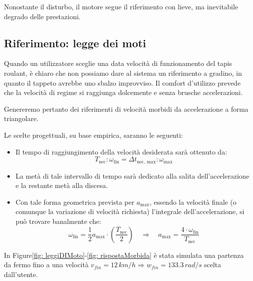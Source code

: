 \documentclass[a4paper,12pt]{article}
\begin{document}
Nonostante il disturbo, il motore segue il riferimento con lieve, ma inevitabile degrado delle prestazioni.


\subsection{Riferimento: legge dei moti}

Quando un utilizzatore sceglie una data velocità di funzionamento del tapis roulant, è chiaro che non possiamo dare al sistema un riferimento a gradino, in quanto il tappeto avrebbe uno sbalzo improvviso. Il comfort d'utilizzo prevede che la velocità di regime si raggiunga dolcemente e senza brusche accelerazioni.

\vspace{0.3cm}

Genereremo pertanto dei riferimenti di velocità morbidi da accelerazione a forma triangolare.

Le scelte progettuali, su base empirica, saranno le seguenti:

\begin{itemize}
    \item Il tempo di raggiungimento della velocità desiderata sarà ottenuto da: 
    \[
    T_{\text{nec}} : \omega_{\text{fin}} = \Delta t_{\text{nec, max}} : \omega_{\text{max}}
    \]
    
    \item La metà di tale intervallo di tempo sarà dedicato alla salita dell'accelerazione e la restante metà alla discesa.
    
    \item Con tale forma geometrica prevista per $a_{\text{max}}$, essendo la velocità finale (o comunque la variazione di velocità richiesta) l'integrale dell'accelerazione, si può trovare banalmente che:
    \[
    \omega_{\text{fin}} = \frac{1}{2} a_{\text{max}} \cdot \left( \frac{T_{\text{nec}}}{2} \right)
    \quad \Rightarrow \quad 
    a_{\text{max}} = \frac{4 \cdot \omega_{\text{fin}}}{T_{\text{nec}}}
    \]
\end{itemize}

In Figure\ref{fig: leggiDIMoto}-\ref{fig: rispostaMorbida} è stata simulata una partenza da fermo fino a una velocità $v_{fin}=12\,km/h\Rightarrow w_{fin}=133.3\,rad/s$ scelta dall’utente.

\vspace{0.5cm}
\end{document}
